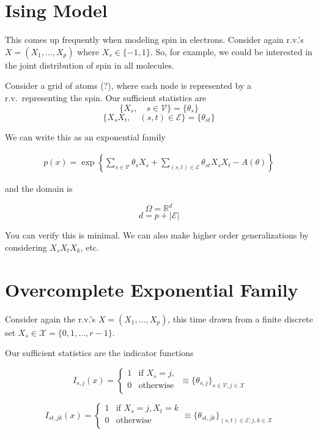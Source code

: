 \documentclass[11pt]{article}
\newcommand{\X}{\mathcal{X}}
\newcommand{\V}{\mathcal{V}}
\newcommand{\e}{\mathcal{E}}
\newcommand{\R}{\mathbb{R}}
\begin{document}
\section{Ising Model}

This comes up frequently when modeling spin in electrons. Consider again r.v.'s $X = (X_1, \ldots, X_p)$ where $X_s \in \{-1, 1\}$. So, for example, we could be interested in the joint distribution of spin in all molecules. 

Consider a grid of atoms (?), where each node is represented by a r.v.~representing the spin. Our sufficient statistics are
$$ \{X_s ,\quad s \in \V\} = \{ \theta_s\} $$
$$ \{X_s X_t ,\quad (s,t) \in \e \} = \{\theta_{st}\}$$

We can write this as an exponential family

\begin{align}
p(x) = \exp \left \{\sum_{s \in \V} \theta_s X_s + \sum_{(s,t) \in \e} \theta_{st} X_sX_t -A(\theta) \right \}
\end{align}

and the domain is

$$\Omega = \R^d $$
$$ d = p + |\e| $$

You can verify this is minimal. We can also make higher order generalizations by considering $X_sX_tX_k$, etc.

\section{Overcomplete Exponential Family}

Consider again the r.v.'s $X = (X_1, \ldots, X_p)$, this time drawn from a finite discrete set $X_s \in \X = \{0, 1, \ldots, r-1\}$.

Our sufficient statistics are the indicator functions

\begin{equation}
I_{s,j} (x) = 
\begin{cases}
1 & \text{if } X_s = j, \\ 
0 & \text{otherwise } \\
\end{cases}
\equiv \{\theta_{s,j}\}_{s \in \V, j \in \X}
\end{equation}

\begin{equation}
I_{st,jk} (x) = 
\begin{cases}
1 & \text{if } X_s = j, X_t = k\\ 
0 & \text{otherwise } \\
\end{cases}
\equiv \{\theta_{st,jk}\}_{(s,t) \in \e; j,k \in \X}
\end{equation}
\end{document}
